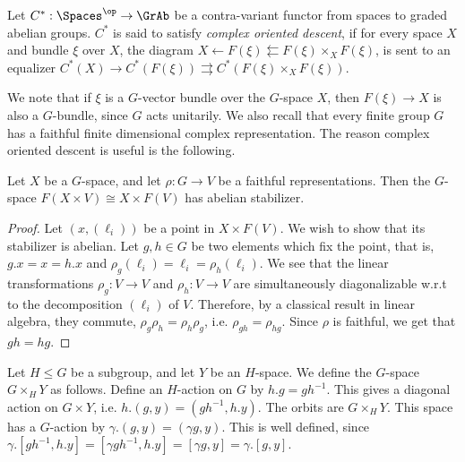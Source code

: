 \begin{definition}
	Let $C^*: \Spaces^\op \to \GrAb$ be a contra-variant functor from spaces to graded abelian groups.
	$C^*$ is said to satisfy \emph{complex oriented descent},
	if for every space $X$ and bundle $\xi$ over $X$, the diagram
	$X \leftarrow F\left(\xi\right) \leftleftarrows F\left(\xi\right) \times_X F\left(\xi\right)$,
	is sent to an equalizer
	$C^*\left(X\right) \to C^*\left(F\left(\xi\right)\right) \rightrightarrows C^*\left(F\left(\xi\right) \times_X F\left(\xi\right)\right)$.
\end{definition}

We note that if $\xi$ is a $G$-vector bundle over the $G$-space $X$, then $F\left(\xi\right) \to X$ is also a $G$-bundle, since $G$ acts unitarily.
We also recall that every finite group $G$ has a faithful finite dimensional complex representation.
The reason complex oriented descent is useful is the following.

\begin{proposition}\label{faithful-triv-bundle}
	Let $X$ be a $G$-space, and let $\rho: G \to V$ be a faithful representations.
	Then the $G$-space $F\left(X \times V\right) \cong X \times F\left(V\right)$ has abelian stabilizer.
\end{proposition}

\begin{proof}
	Let $\left(x, \left(\ell_i\right)\right)$ be a point in $X \times F\left(V\right)$.
	We wish to show that its stabilizer is abelian.
	Let $g,h \in G$ be two elements which fix the point, that is, $g.x = x = h.x$ and $\rho_g\left(\ell_i\right) = \ell_i = \rho_h\left(\ell_i\right)$.
	We see that the linear transformations $\rho_g: V \to V$ and $\rho_h: V \to V$ are simultaneously diagonalizable w.r.t to the decomposition $\left(\ell_i\right)$ of $V$.
	Therefore, by a classical result in linear algebra, they commute, $\rho_g \rho_h = \rho_h \rho_g$, i.e. $\rho_{gh} = \rho_{hg}$.
	Since $\rho$ is faithful, we get that $gh = hg$.
\end{proof}

\begin{definition}
	Let $H \leq G$ be a subgroup, and let $Y$ be an $H$-space.
	We define the $G$-space $G \times_H Y$ as follows.
	Define an $H$-action on $G$ by $h.g = gh^{-1}$.
	This gives a diagonal action on $G \times Y$, i.e. $h.\left(g, y\right) = \left(g h^{-1}, h.y\right)$.
	The orbits are $G \times_H Y$.
	This space has a $G$-action by $\gamma. \left(g, y\right) = \left(\gamma g, y\right)$.
	This is well defined, since
	$
	\gamma. \left[g h^{-1}, h.y\right]
	= \left[\gamma g h^{-1}, h.y\right]
	= \left[\gamma g, y\right]
	= \gamma . \left[g, y\right]
	$.
\end{definition}

